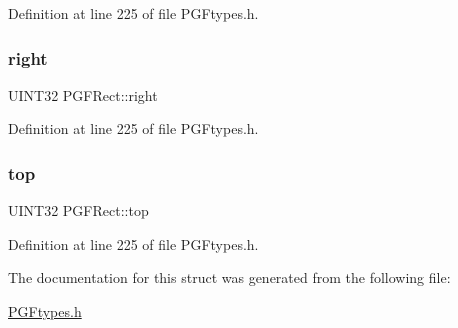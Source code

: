 Definition at line 225 of file P\+G\+Ftypes.\+h.

\mbox{\label{structPGFRect_a9174d8de6b9018e0c4ef8e29a501b10a}} 
\subsubsection{\texorpdfstring{right}{right}}
{\footnotesize\ttfamily U\+I\+N\+T32 P\+G\+F\+Rect\+::right}



Definition at line 225 of file P\+G\+Ftypes.\+h.

\mbox{\label{structPGFRect_a79df6810b4ffbf8c8825a67733d56913}} 
\subsubsection{\texorpdfstring{top}{top}}
{\footnotesize\ttfamily U\+I\+N\+T32 P\+G\+F\+Rect\+::top}



Definition at line 225 of file P\+G\+Ftypes.\+h.



The documentation for this struct was generated from the following file\+:\begin{DoxyCompactItemize}
\item 
\mbox{\hyperlink{PGFtypes_8h}{P\+G\+Ftypes.\+h}}\end{DoxyCompactItemize}
